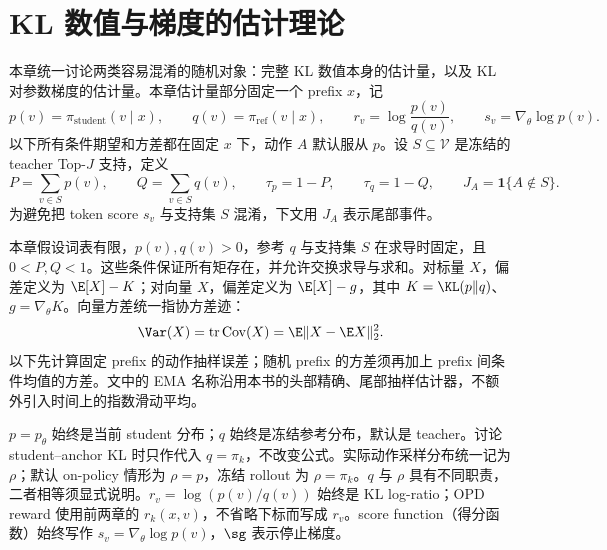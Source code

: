 \chapter{KL 数值与梯度的估计理论}
\label{chap:kl-estimation}

本章统一讨论两类容易混淆的随机对象：完整 KL 数值本身的估计量，以及 KL 对参数梯度的估计量。本章估计量部分固定一个 prefix $x$，记
\[
 p(v)=\pi_{\mathrm{student}}(v\mid x),\qquad
 q(v)=\pi_{\mathrm{ref}}(v\mid x),\qquad
 r_v=\log\frac{p(v)}{q(v)},\qquad
 s_v=\nabla_\theta\log p(v).
\]
以下所有条件期望和方差都在固定 $x$ 下，动作 $A$ 默认服从 $p$。设 $S\subseteq\mathcal V$ 是冻结的 teacher Top-$J$ 支持，定义
\[
 P=\sum_{v\in S}p(v),\qquad Q=\sum_{v\in S}q(v),\qquad
 \tau_p=1-P,\qquad \tau_q=1-Q,\qquad J_A=\mathbf 1\{A\notin S\}.
\]
为避免把 token score $s_v$ 与支持集 $S$ 混淆，下文用 $J_A$ 表示尾部事件。

本章假设词表有限，$p(v),q(v)>0$，参考 $q$ 与支持集 $S$ 在求导时固定，且 $0<P,Q<1$。这些条件保证所有矩存在，并允许交换求导与求和。对标量 $X$，偏差定义为 $\E[X]-K$；对向量 $X$，偏差定义为 $\E[X]-g$，其中 $K=\KL(p\Vert q)$、$g=\nabla_\theta K$。向量方差统一指协方差迹：
\[
 \Var(X)=\operatorname{tr}\operatorname{Cov}(X)
 =\E\lVert X-\E X\rVert_2^2.
\]
以下先计算固定 prefix 的动作抽样误差；随机 prefix 的方差须再加上 prefix 间条件均值的方差。文中的 EMA 名称沿用本书的头部精确、尾部抽样估计器，不额外引入时间上的指数滑动平均。

\begin{definition}[本章唯一的分布与导数记号]
$p=p_\theta$ 始终是当前 student 分布；$q$ 始终是冻结参考分布，默认是 teacher。讨论 student--anchor KL 时只作代入 $q=\pi_k$，不改变公式。实际动作采样分布统一记为 $\rho$；默认 on-policy 情形为 $\rho=p$，冻结 rollout 为 $\rho=\pi_k$。$q$ 与 $\rho$ 具有不同职责，二者相等须显式说明。$r_v=\log(p(v)/q(v))$ 始终是 KL log-ratio；OPD reward 使用前两章的 $r_k(x,v)$，不省略下标而写成 $r_v$。score function（得分函数）始终写作 $s_v=\nabla_\theta\log p(v)$，$\sg$ 表示停止梯度。
\end{definition}

